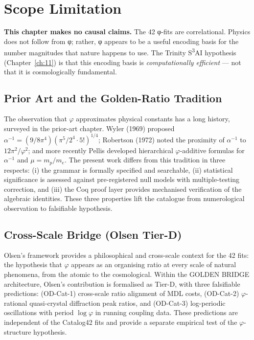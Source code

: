 \section{Scope Limitation}

\textbf{This chapter makes no causal claims.} The 42 φ-fits are correlational.
Physics does not follow from φ; rather, φ appears to be a useful encoding basis
for the number magnitudes that nature happens to use. The Trinity S\textsuperscript{3}AI
hypothesis (Chapter~\ref{ch:11}) is that this encoding basis is
\emph{computationally efficient} — not that it is cosmologically fundamental.

\subsection{Prior Art and the Golden-Ratio Tradition}

The observation that \(\varphi\) approximates physical constants has a long history, surveyed in the prior-art chapter. Wyler (1969) proposed \(\alpha^{-1} = (9/8\pi^4)(\pi^5/2^4 \cdot 5!)^{1/4}\); Robertson (1972) noted the proximity of \(\alpha^{-1}\) to \(12\pi^2/\varphi^2\); and more recently Pellis developed hierarchical \(\varphi\)-additive formulas for \(\alpha^{-1}\) and \(\mu = m_p/m_e\). The present work differs from this tradition in three respects: (i) the grammar is formally specified and searchable, (ii) statistical significance is assessed against pre-registered null models with multiple-testing correction, and (iii) the Coq proof layer provides mechanised verification of the algebraic identities. These three properties lift the catalogue from numerological observation to falsifiable hypothesis.

\subsection{Cross-Scale Bridge (Olsen Tier-D)}

Olsen's framework provides a philosophical and cross-scale context for the 42 fits: the hypothesis that \(\varphi\) appears as an organising ratio at every scale of natural phenomena, from the atomic to the cosmological. Within the GOLDEN BRIDGE architecture, Olsen's contribution is formalised as Tier-D, with three falsifiable predictions: (OD-Cat-1) cross-scale ratio alignment of MDL costs, (OD-Cat-2) \(\varphi\)-rational quasi-crystal diffraction peak ratios, and (OD-Cat-3) log-periodic oscillations with period \(\log \varphi\) in running coupling data. These predictions are independent of the Catalog42 fits and provide a separate empirical test of the \(\varphi\)-structure hypothesis.

